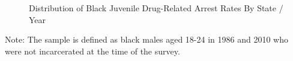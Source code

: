   \clearpage

  \begin{figure}[h]
    \centering
    \caption{Distribution of Black Juvenile Drug-Related Arrest Rates By State / Year}%
    \qquad
    \label{fig:density_jb}%
  \end{figure}
  \begin{footnotesize}
    \noindent Note:
    The sample is defined as black males aged 18-24 in 1986 and 2010 who were not incarcerated at the time of the survey. 
  \end{footnotesize}

